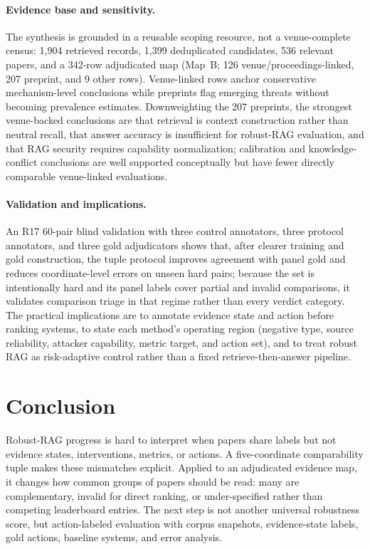 \documentclass[runningheads]{llncs}
\begin{document}
\paragraph{Evidence base and sensitivity.} The synthesis is grounded in a reusable scoping resource, not a venue-complete census: 1,904 retrieved records, 1,399 deduplicated candidates, 536 relevant papers, and a 342-row adjudicated map (Map~B; 126 venue/proceedings-linked, 207 preprint, and 9 other rows). Venue-linked rows anchor conservative mechanism-level conclusions while preprints flag emerging threats without becoming prevalence estimates. Downweighting the 207 preprints, the strongest venue-backed conclusions are that retrieval is context construction rather than neutral recall, that answer accuracy is insufficient for robust-RAG evaluation, and that RAG security requires capability normalization; calibration and knowledge-conflict conclusions are well supported conceptually but have fewer directly comparable venue-linked evaluations.

\paragraph{Validation and implications.} An R17 60-pair blind validation with three control annotators, three protocol annotators, and three gold adjudicators shows that, after clearer training and gold construction, the tuple protocol improves agreement with panel gold and reduces coordinate-level errors on unseen hard pairs; because the set is intentionally hard and its panel labels cover partial and invalid comparisons, it validates comparison triage in that regime rather than every verdict category. The practical implications are to annotate evidence state and action before ranking systems, to state each method's operating region (negative type, source reliability, attacker capability, metric target, and action set), and to treat robust RAG as risk-adaptive control rather than a fixed retrieve-then-answer pipeline.

\section{Conclusion}

Robust-RAG progress is hard to interpret when papers share labels but not evidence states, interventions, metrics, or actions. A five-coordinate comparability tuple makes these mismatches explicit. Applied to an adjudicated evidence map, it changes how common groups of papers should be read: many are complementary, invalid for direct ranking, or under-specified rather than competing leaderboard entries. The next step is not another universal robustness score, but action-labeled evaluation with corpus snapshots, evidence-state labels, gold actions, baseline systems, and error analysis.
\end{document}
